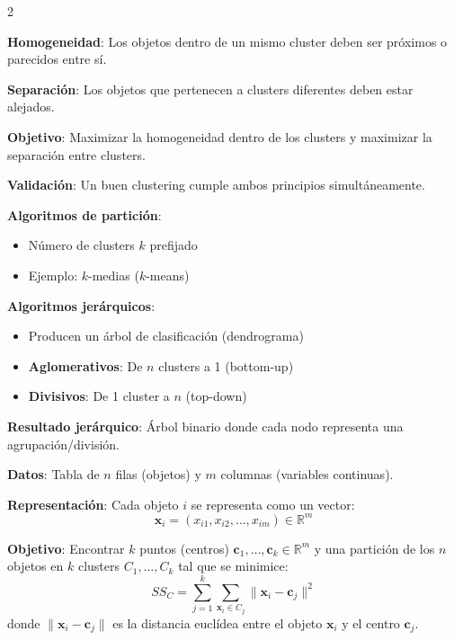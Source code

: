\documentclass[10pt,a4paper]{article}
\begin{document}
\begin{multicols}{2}
    \begin{tcolorbox}[title=Principios Básicos, equal height group=CL1]
        \textbf{Homogeneidad}: Los objetos dentro de un mismo cluster deben ser próximos o parecidos entre sí.
        
        \textbf{Separación}: Los objetos que pertenecen a clusters diferentes deben estar alejados.
        
        \textbf{Objetivo}: Maximizar la homogeneidad dentro de los clusters y maximizar la separación entre clusters.
        
        \textbf{Validación}: Un buen clustering cumple ambos principios simultáneamente.
    \end{tcolorbox}
    \begin{tcolorbox}[title=Tipos de Algoritmos, equal height group=CL1]
        \textbf{Algoritmos de partición}:
        \begin{itemize}
            \item Número de clusters $k$ prefijado
            \item Ejemplo: $k$-medias ($k$-means)
        \end{itemize}
        
        \textbf{Algoritmos jerárquicos}:
        \begin{itemize}
            \item Producen un árbol de clasificación (dendrograma)
            \item \textbf{Aglomerativos}: De $n$ clusters a 1 (bottom-up)
            \item \textbf{Divisivos}: De 1 cluster a $n$ (top-down)
        \end{itemize}
        
        \textbf{Resultado jerárquico}: Árbol binario donde cada nodo representa una agrupación/división.
    \end{tcolorbox}
\end{multicols}


\begin{tcolorbox}[title=Descripción del Problema]
    \textbf{Datos}: Tabla de $n$ filas (objetos) y $m$ columnas (variables continuas).
    
    \textbf{Representación}: Cada objeto $i$ se representa como un vector:
    \[
        \mathbf{x}_i = (x_{i1}, x_{i2}, \ldots, x_{im}) \in \mathbb{R}^m
    \]
    
    \textbf{Objetivo}: Encontrar $k$ puntos (centros) $\mathbf{c}_1, \ldots, \mathbf{c}_k \in \mathbb{R}^m$ y una partición de los $n$ objetos en $k$ clusters $C_1, \ldots, C_k$ tal que se minimice:
    \[
        SS_C = \sum_{j=1}^k \sum_{\mathbf{x}_i \in C_j} \|\mathbf{x}_i - \mathbf{c}_j\|^2
    \]
    donde $\|\mathbf{x}_i - \mathbf{c}_j\|$ es la distancia euclídea entre el objeto $\mathbf{x}_i$ y el centro $\mathbf{c}_j$.
\end{tcolorbox}
\end{document}
